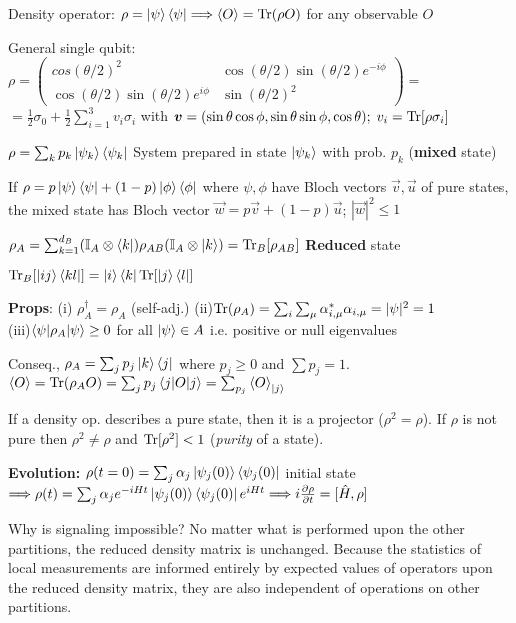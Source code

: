 \begin{squishlist}
    \item Density operator: $\rho = \ket{\psi} \bra{\psi} \Longrightarrow \braket{O} = \mathrm{Tr} (\rho O)$ for any observable $O$
\item General single qubit: $\rho = \begin{pmatrix} cos(\theta/2)^2 & \cos(\theta/2)\sin(\theta/2)e^{-i\phi} \\ \cos(\theta/2)\sin(\theta/2)e^{i\phi} & \sin(\theta/2)^2 \end{pmatrix} = $ \\
$= \frac{1}{2}\sigma_0 + \frac{1}{2}\sum_{i=1}^3 v_i \sigma_i$ with $\mbox{\boldmath$v$} = (\sin\theta \cos\phi , \sin\theta\sin\phi, \cos\theta);\; v_i = \mathrm{Tr}[\rho \sigma_i]$
\item $\rho = \sum_k p_k \ket{\psi_k}\bra{\psi_k}$ System prepared in state $\ket{\psi_k}$ with prob. $p_k$ (\textbf{mixed} state)
\item If $\rho = p \ket{\psi}\bra{\psi} + (1-p) \ket{\phi}\bra{\phi}$ where
$\psi, \phi$ have Bloch vectors $\vec{v}, \vec{u}$ of pure states, the mixed state has Bloch vector $\vec{w} = p \vec{v} + (1-p) \vec{u}$; $|\vec{w}|^2 \leq 1$
\item $\rho_A = \sum_{k=1}^{d_B}(\mathbb{I}_A \otimes \bra{k})\rho_{AB}(\mathbb{I}_A \otimes \ket{k}) = \mathrm{Tr}_B[\rho_{AB}]$ \quad \textbf{Reduced} state
\item $\mathrm{Tr}_B[\ket{ij}\bra{kl}] = \ket{i}\bra{k} \mathrm{Tr}[\ket{j}\bra{l}]$
\item \textbf{Props}: 
(i) $\rho_A^{\dagger} = \rho_A$ (self-adj.) \qquad (ii)$\mathrm{Tr}(\rho_A) = \sum_i  \sum_{\mu}\alpha^*_{i,\mu}\alpha_{i,\mu} = |\psi|^2 = 1$ \\ (iii)$\braket{\psi|\rho_A|\psi} \geq 0$ for all $\ket{\psi} \in A$ i.e. positive or null eigenvalues
\item Conseq., $\rho_A = \sum_j p_j \ket{k}\bra{j}$ where $p_j\geq 0$ and $\sum p_j = 1$.\\ $\braket{O} = \mathrm{Tr}(\rho_A O) = \sum_j p_j \braket{j|O|j} = \sum_{p_j} \braket{O}_{\ket{j}}$
\item If a density op. describes a pure state, then it is a projector ($\rho^2 = \rho$). If $\rho$ is not pure then $\rho^2 \neq \rho$ and $\mathrm{Tr}[\rho^2] < 1$ (\emph{purity} of a state).
\item \textbf{Evolution:} $\rho(t=0) = \sum_j \alpha_j \ket{\psi_j(0)}\bra{\psi_j(0)}$ initial state \\ $\Longrightarrow \rho(t) = \sum_j \alpha_j e^{-iHt} \ket{\psi_j(0)}\bra{\psi_j(0)}e^{iHt} \Longrightarrow i \frac{\partial \rho}{\partial t} = [\hat{H},\rho]$
\item Why is signaling impossible? No matter what is performed upon the other partitions, the reduced density matrix is unchanged. Because the statistics of local measurements are informed entirely by expected values of operators upon the reduced density matrix, they are also independent of operations on other partitions.
\end{squishlist}

